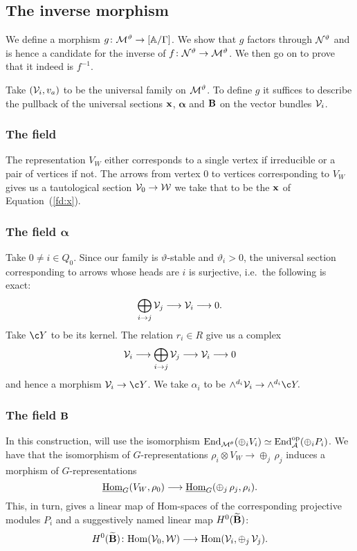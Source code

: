 \documentclass{amsart}
\newcommand{\balpha}{\boldsymbol{\alpha}}
\theoremstyle{definition}
\newcommand\VW{V_W}
\newcommand\Y{Y}
\begin{document}
\subsection{The inverse morphism}

We define a morphism  $g \colon \mathcal{M}^\vartheta \rightarrow [\mathbb{A}/\Gamma]$.
We show that $g$ factors through $\mathcal{N}^\vartheta$ and is hence a candidate for the inverse of $f \colon \mathcal{N}^\vartheta \rightarrow \mathcal{M}^\vartheta$.
We then go on to prove that it indeed is $f^{-1}$.

Take $(\mathcal{V}_i, v_a)$ to be the universal family on $\mathcal{M}^\vartheta$.
To define $g$ it suffices to describe the pullback of the universal sections $\mathbf{x}$, $\balpha$ and $\mathbf{B}$ on the vector bundles $\mathcal{V}_i$.

\subsubsection{The field \bfx}

The representation $\VW$ either corresponds to a single vertex if irreducible or a pair of vertices if not.
The arrows from vertex $0$ to vertices corresponding to $\VW$ gives us a tautological section $\mathcal{V}_0 \rightarrow \mathcal{W}$ we take that to be the $\mathbf{x}$ of Equation~(\ref{fd:x}).

\subsubsection{The field $\balpha$}\label{sssc:alpha}

Take $0 \neq i \in Q_0$.
Since our family is $\vartheta$-stable and $\vartheta_i>0$, the universal section corresponding to arrows whose heads are $i$ is surjective, i.e.\ the following is exact:
\begin{equation}\label{eq:k}
    \bigoplus_{i \rightarrow j} \mathcal{V}_j \longrightarrow \mathcal{V}_i \longrightarrow 0.
\end{equation}
Take $\c\Y$ to be its kernel.
The relation $r_i \in R$ give us a complex
$$\mathcal{V}_i \longrightarrow \bigoplus_{i \rightarrow j} \mathcal{V}_j \longrightarrow \mathcal{V}_i \longrightarrow 0$$
and hence a morphism $\cV_i \rightarrow \c\Y$.
We take $\alpha_i$ to be $\wedge^{d_i} \cV_i \rightarrow \wedge^{d_i}\c\Y.$

\subsubsection{The field $\mathbf{B}$}
In this construction, will use the isomorphism $\operatorname{End}_{\mathcal{M}^\theta}(\oplus_i V_i) \simeq \operatorname{End}^{\text{op}}_{\mathcal{A}}(\oplus_i P_i)$.
We have that the isomorphism of $G$-representations $\rho_i \otimes \VW \rightarrow \oplus_j\, \rho_j$ induces a morphism of $G$-representations $$\underline{\Hom}_G(\VW,\rho_0) \longrightarrow \underline{\Hom}_G(\oplus_j \, \rho_j, \rho_i).$$
This, in turn, gives a linear map of Hom-spaces of the corresponding projective modules $P_i$ and a suggestively named linear map $H^0(\widetilde{\mathbf{B}})$:
\begin{equation}\label{eq:homsp}
    H^0(\widetilde{\mathbf{B}}) \colon {\operatorname{Hom}}(\mathcal{V}_0, \mathcal{W}) \longrightarrow {\operatorname{Hom}}(\mathcal{V}_i, \oplus_j \, \mathcal{V}_j).
\end{equation}
\end{document}
